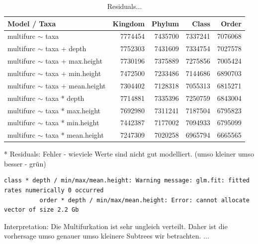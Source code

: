         \begin{table}[h]
          \begin{center}
            \begin{tabular}{ |l|r|r|r|r| }
              \hline
              Model / Taxa & Kingdom & Phylum & Class & Order \\
              \hline \hline
              multifurc $\sim$ taxa & 7774454 & 7435700 & 7337241 & 7076068 \\
              \hline
              multifurc $\sim$ taxa + depth & 7752303 & 7431609 & 7334754 & 7027578 \\
              multifurc $\sim$ taxa + max.height & 7730196 & 7375889 & 7275856 & 7005424 \\
              multifurc $\sim$ taxa + min.height & 7472500 & 7233486 & 7144686 & \cellcolor{green!50}6890703 \\
              multifurc $\sim$ taxa + mean.height & 7304402 & 7128318 & 7055313 & \cellcolor{green!50}6815271 \\
              \hline
              multifurc $\sim$ taxa * depth & 7714881 & 7335396 & 7250759 & \cellcolor{green!50}6843004 \\
              multifurc $\sim$ taxa * max.height & 7692980 & 7311241 & 7187504 & \cellcolor{green!50}6795823 \\
              multifurc $\sim$ taxa * min.height & 7442387 & 7177002 & 7094933 & \cellcolor{green!50}6795099 \\
              multifurc $\sim$ taxa * mean.height & 7247309 & 7020258 & \cellcolor{green!50}6965794 & \cellcolor{green!50}6665565 \\
              \hline
            \end{tabular} 
          \end{center}
          \caption{Residuals...}
          \label{table:...} 
        \end{table}
        * Residuals: Fehler - wieviele Werte sind nicht gut modelliert. (umso kleiner umso besser - grün) \\

        \begin{lstlisting}[gobble=8]
          class * depth / min/max/mean.height: Warning message: glm.fit: fitted rates numerically 0 occurred
          order * depth / min/max/mean.height: Error: cannot allocate vector of size 2.2 Gb
        \end{lstlisting}

        Interpretation: Die Multifurkation ist sehr ungleich verteilt. Daher ist die vorhersage umso 
          genauer umso kleinere Subtrees wir betrachten. ...
        
